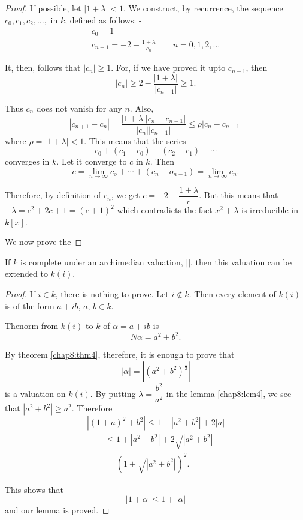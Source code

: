 \begin{proof}
If possible, let $| 1 + \lambda| < 1$. We construct, by recurrence, the
sequence $c_0 , c_1, c_2 , \ldots , $ in $k$, defined as follows: -  
\begin{gather*}
c_0 = 1 \\
c_{n + 1} = - 2- \frac{1 + \lambda}{c_n} \qquad n = 0, 1, 2, \ldots 
\end{gather*}

It, then, follows that $|c_n |\geq 1$. For, if we have proved it upto
$c_{n -1}$, then  
$$
|c_n| \geq 2 - \frac{|1+\lambda|}{|c_{n-1}|} \geq 1. 
$$

Thus $c_n$ does not vanish for any $n$. Also, 
$$
|c_{n +1} - c_n| = \frac{|1+\lambda | |c_n - c_{n-1}|}{|c_n||c_{n-1}|}
\leq \rho |c_n-c_{n-1}| 
$$
where $\rho = |1+\lambda| < 1$. This means that the series  
$$
c_0 + (c_1 - c_0) + (c_2 - c_1) + \cdots 
$$  
converges in $k$. Let it converge to $c$ in $k$. Then  
$$
c= \lim_{ n \to \infty} c_o + \cdots + (c_n - o_{ n -1}) = \lim_{ n 
  \to \infty} c_n. 
$$ 
 
Therefore, by definition of $c_n$, we get $c = -2-
\dfrac{1+\lambda}{c}$. But this means that $- \lambda =c^2 + 2c + 1 =
(c + 1)^2$ which contradicts the fact $x^2 + \lambda$ is irreducible
in $k[x]$.  

We now prove the 
\end{proof}

\begin{lem}\label{chap8:lem5} %
 If $k$ is complete under an archimedian valuation, $||$, then this
  valuation can be extended to $k(i)$.  
\end{lem}

\begin{proof}
If $i \in k$, there is nothing to prove. Let $ i \notin k$. Then every
element of $k(i)$ is of the form $a + ib$, $a$, $b \in k$.  

The\pageoriginale norm from $k(i)$ to $k$ of $\alpha  = a + ib $ is   
$$
N \alpha = a^2 + b^2 . 
$$

By theorem \ref{chap8:thm4}, therefore, it is enough to prove that  
$$
|\alpha| = |(a^2 + b^2)^{ \frac{1}{2}}|
$$
is a valuation on $k(i)$. By putting $\lambda = \dfrac{b^2}{a^2} $ in
the lemma \ref{chap8:lem4}, we see that $|a^2 + b^2 |\geq a^2 $. Therefore  
$$
|(1+a)^2 + b^2| \leq 1 +| a^2 + b^2 | + 2 | a | 
$$ 
\begin{align*}
& \leq 1 + |a^ 2 + b^2 | + 2 \sqrt{ |a^2 + b^2|}\\ 
& = (1 + \sqrt{ |a^2 + b^2 |})^2. 
\end{align*}

This shows that 
$$
| 1 + \alpha | \leq 1 + | \alpha |
$$
and our lemma is proved. 
\end{proof}

